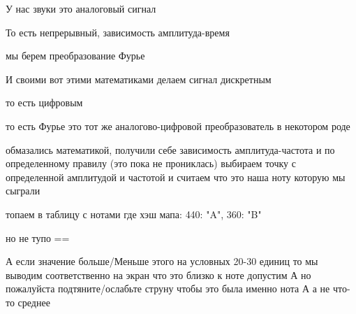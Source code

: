 
У нас звуки это аналоговый сигнал

То есть непрерывный, зависимость амплитуда-время

мы берем преобразование Фурье

И своими вот этими математиками делаем сигнал дискретным

то есть цифровым

то есть Фурье это тот же аналогово-цифровой преобразователь в некотором роде

обмазались математикой, получили себе зависимость амплитуда-частота
и по определенному правилу (это пока не прониклась) выбираем точку с определенной амплитудой и частотой и считаем что это наша ноту которую мы сыграли

топаем в таблицу с нотами где хэш мапа: {440: "A", 360: "B"}

но не тупо ==

А если значение больше/Меньше этого на условных 20-30 единиц то мы выводим соответственно на экран что это близко к ноте допустим А но пожалуйста подтяните/ослабьте струну чтобы это была именно нота А а не что-то среднее
